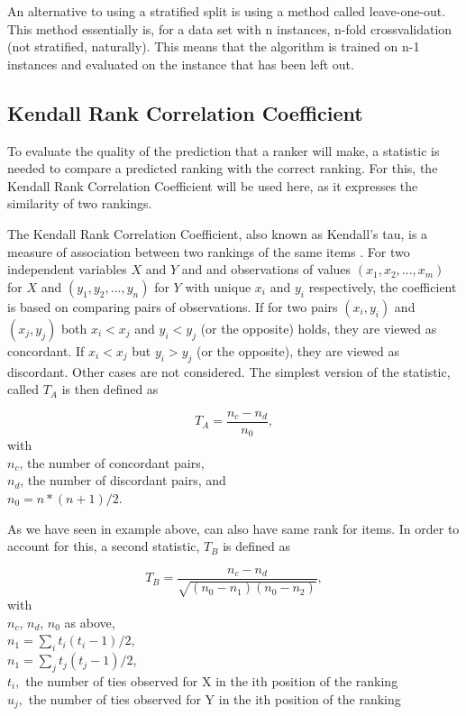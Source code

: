 An alternative to using a stratified split is using a method called leave-one-out. This method essentially is, for a data set with n instances, n-fold crossvalidation (not stratified, naturally). This means that the algorithm is trained on n-1 instances and evaluated on the instance that has been left out.

\subsection{Kendall Rank Correlation Coefficient}
To evaluate the quality of the prediction that a ranker will make, a statistic is needed to compare a predicted ranking with the correct ranking. For this, the Kendall Rank Correlation Coefficient will be used here, as it expresses the similarity of two rankings.

The Kendall Rank Correlation Coefficient, also known as Kendall's tau, is a measure of association between two rankings of the same items \cite{kendall1938new}. For two independent variables $X$ and $Y$ and and observations of values $(x_1,x_2,...,x_m)$ for $X$ and $(y_1,y_2,...,y_n)$ for $Y$ with unique $x_i$ and $y_i$ respectively, the coefficient is based on comparing pairs of observations. If for two pairs $(x_i,y_i)$ and $(x_j,y_j)$ both $x_i < x_j$ and $y_i < y_j$ (or the opposite) holds, they are viewed as concordant. If $x_i < x_j$ but $y_i > y_j$ (or the opposite), they are viewed as discordant. Other cases are not considered. The simplest version of the statistic, called $T_A$ is then defined as 

$$T_A = \frac{n_c - n_d}{n_0},$$
with \\
$n_c$, the number of concordant pairs, \\
$n_d$, the number of discordant pairs, and \\
$n_0 = n * (n + 1) / 2$.

As we have seen in example above, can also have same rank for items. In order to account for this, a second statistic, $T_B$ is defined as

$$T_B = \frac{n_c - n_d}{\sqrt{(n_0 - n_1 )(n_0 - n_2 )}},$$
with \\
$n_c$, $n_d$, $n_0$ as above, \\
$n_1=\sum_i{t_i(t_i-1)/2}$, \\
$n_1=\sum_j{t_j(t_j-1)/2}$, \\
$t_i,$ the number of ties observed for X in the ith position of the ranking \\
$u_j,$ the number of ties observed for Y in the ith position of the ranking 

